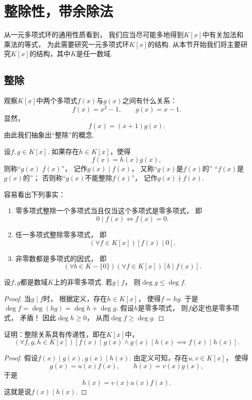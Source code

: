 \section{整除性，带余除法}
从一元多项式环的通用性质看到，
我们应当尽可能多地得到\(K[x]\)中有关加法和乘法的等式，
为此需要研究一元多项式环\(K[x]\)的结构.
从本节开始我们将主要研究\(K[x]\)的结构，其中\(K\)是任一数域.

\subsection{整除}
观察\(K[x]\)中两个多项式\(f(x)\)与\(g(x)\)之间有什么关系：\[
	f(x)=x^2-1, \qquad
	g(x)=x-1.
\]
显然，\[
	f(x)=(x+1) g(x).
\]
由此我们抽象出“整除”的概念.

\begin{definition}
设\(f,g \in K[x]\).
如果存在\(h \in K[x]\)，使得\[
	f(x) = h(x) g(x),
\]
则称“\(g(x)\)  \(f(x)\)”，
记作\(g(x) \mid f(x)\)，
又称“\(g(x)\)是\(f(x)\)的”
“\(f(x)\)是\(g(x)\)的”；
否则称“\(g(x)\)不能整除\(f(x)\)”，
记作\(g(x) \nmid f(x)\).
\end{definition}

容易看出下列事实：
\begin{enumerate}
	\item 零多项式整除一个多项式当且仅当这个多项式是零多项式，
	即\[
		0 \mid f(x)
		\iff
		f(x) = 0.
	\]
	\item 任一多项式整除零多项式，
	即\[
		(\forall f \in K[x])
		[f(x) \mid 0].
	\]
	\item 非零数都是多项式的因式，
	即\[
		(\forall b \in K - \{0\})
		(\forall f \in K[x])
		[b \mid f(x)].
	\]
\end{enumerate}

\begin{proposition}
设\(f,g\)都是数域\(K\)上的非零多项式.
若\(g \mid f\)，
则\(\deg g \leq \deg f\).
\begin{proof}
当\(g \mid f\)时，
根据定义，存在\(h \in K[x]\)，
使得\(f = h g\).
于是\(
	\deg f
	= \deg(hg)
	= \deg h + \deg g
\).
假设\(h\)是零多项式，
则\(f\)必定也是零多项式，
矛盾！
因此\(\deg h\geq0\)，
从而\(\deg f\geq\deg g\).
\end{proof}
\end{proposition}

\begin{example}
证明：整除关系具有传递性，即在\(K[x]\)中，\[
	(\forall f,g,h \in K[x])
	[
		f(x) \mid g(x) \land g(x) \mid h(x)
		\implies
		f(x) \mid h(x)
	].
\]
\begin{proof}
假设\(f(x) \mid g(x), g(x) \mid h(x)\).
由定义可知，存在\(u,v \in K[x]\)，
使得\[
	g(x) = u(x) f(x), \qquad
	h(x) = v(x) g(x),
\]
于是\[
	h(x) = v(x) u(x) f(x).
\]
这就是说\(f(x) \mid h(x)\).
\end{proof}
\end{example}

